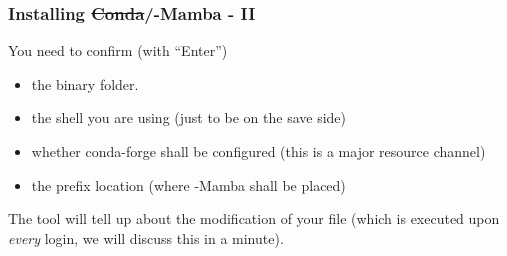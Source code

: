 \begin{frame}
  \frametitle{Installing \sout{Conda}/\textmu-Mamba - II}
  You need to confirm (with ``Enter'')
  \begin{itemize}[<+->]
	\item the binary folder.
	\item the shell you are using (just to be on the save side)
	\item whether conda-forge shall be configured (this is a major resource channel)
	\item the prefix location (where \textmu-Mamba shall be placed)
  \end{itemize} 
  The tool will tell up about the modification of your  file (which is executed upon \emph{every} login, we will discuss this in a minute).
\end{frame}
	

 
 
% 
% 

